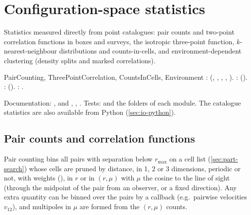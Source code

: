 \chapter{Configuration-space statistics}\label{ch:configuration-space}

Statistics measured directly from point catalogues: pair counts and two-point correlation functions in boxes and surveys,
the isotropic three-point function, $k$-nearest-neighbour distributions and counts-in-cells, and environment-dependent
clustering (density splits and marked correlations).

\begin{modulebox}{PairCounting, ThreePointCorrelation, CountsInCells, Environment}
:  (,
, , ,
). : 
(). :  ().
: .\par
Documentation: ,  and ,
, . Tests:  and the  folders of
each module. The catalogue statistics are also available from Python (\cref{sec:io-python}).
\end{modulebox}

\section{Pair counts and correlation functions}\label{sec:cs-pairs}

Pair counting bins all pairs with separation below $r_{\max}$ on a cell list (\cref{sec:part-search}) whose cells are pruned by distance,
in 1, 2 or 3 dimensions, periodic or not, with weights (), in $r$ or in $(r,\mu)$ with $\mu$ the cosine to the line of sight
(through the midpoint of the pair from an observer, or a fixed direction). Any extra quantity can be binned over the pairs by a callback
(e.g.\ pairwise velocities $v_{12}$), and multipoles in $\mu$ are formed from the $(r,\mu)$ counts.

